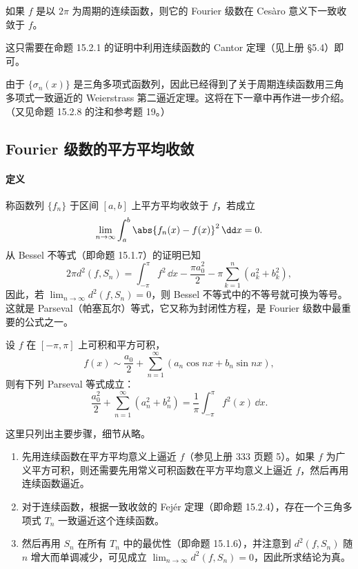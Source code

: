 \begin{xproposition}
如果 $f$ 是以 $2\pi$ 为周期的连续函数，则它的 Fourier 级数在 Cesàro 意义下一致收敛于 $f$。
\end{xproposition}

\begin{xremark}
这只需要在命题 15.2.1 的证明中利用连续函数的 Cantor 定理（见上册 §5.4）即可。
\end{xremark}

\begin{xremark}
由于 $\{\sigma_n(x)\}$ 是三角多项式函数列，因此已经得到了关于周期连续函数用三角多项式一致逼近的 Weierstrass 第二逼近定理。这将在下一章中再作进一步介绍。（又见命题 15.2.8 的注和参考题 19。）
\end{xremark}

\subsection{Fourier 级数的平方平均收敛}

\paragraph{定义}
称函数列 $\{f_n\}$ 于区间 $[a,b]$ 上平方平均收敛于 $f$，若成立
\[
  \lim_{n\to\infty}\int_a^b\abs{f_n(x)-f(x)}^2\,\dd x=0.
\]
从 Bessel 不等式（即命题 15.1.7）的证明已知
\[
  2\pi d^2(f,S_n)=\int_{-\pi}^{\pi}f^2\,\dd x-\frac{\pi a_0^2}{2}-\pi\sum_{k=1}^{n}(a_k^2+b_k^2),
\]
因此，若 $\lim_{n\to\infty}d^2(f,S_n)=0$，则 Bessel 不等式中的不等号就可换为等号。这就是 Parseval（帕塞瓦尔）等式，它又称为封闭性方程，是 Fourier 级数中最重要的公式之一。

\begin{xproposition}[15.2.5（Parseval 等式）]
设 $f$ 在 $[-\pi,\pi]$ 上可积和平方可积，
\[
  f(x)\sim\frac{a_0}{2}+\sum_{n=1}^{\infty}(a_n\cos nx+b_n\sin nx),
\]
则有下列 Parseval 等式成立：
\begin{equation}
  \frac{a_0^2}{2}+\sum_{n=1}^{\infty}(a_n^2+b_n^2)
  =\frac1\pi\int_{-\pi}^{\pi}f^2(x)\,\dd x.
  \tag{15.22}
  \label{eq:15.22}
\end{equation}
\end{xproposition}

\begin{xproof}
这里只列出主要步骤，细节从略。
\begin{enumerate}[label=(\arabic*)]
  \item 先用连续函数在平方平均意义上逼近 $f$（参见上册 333 页题 5）。如果 $f$ 为广义平方可积，则还需要先用常义可积函数在平方平均意义上逼近 $f$，然后再用连续函数逼近。
  \item 对于连续函数，根据一致收敛的 Fejér 定理（即命题 15.2.4），存在一个三角多项式 $T_n$ 一致逼近这个连续函数。
  \item 然后再用 $S_n$ 在所有 $T_n$ 中的最优性（即命题 15.1.6），并注意到 $d^2(f,S_n)$ 随 $n$ 增大而单调减少，可见成立 $\lim_{n\to\infty}d^2(f,S_n)=0$，因此所求结论为真。
\end{enumerate}
\end{xproof}

